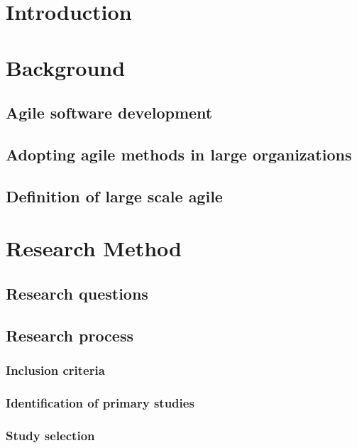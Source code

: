\documentclass{article}
\author{Ville Kumpulainen}
\begin{document}
\clearpage
{}



\clearpage
{\tableofcontents}

\clearpage

\clearpage
\section{Introduction}


\section{Background}

\subsection{Agile software development}

\subsection{Adopting agile methods in large organizations}

\subsection{Definition of large scale agile}


\section{Research Method}

\subsection{Research questions}

\subsection{Research process}

\subsubsection{Inclusion criteria}

\subsubsection{Identification of primary studies}

\subsubsection{Study selection}

\end{document}
